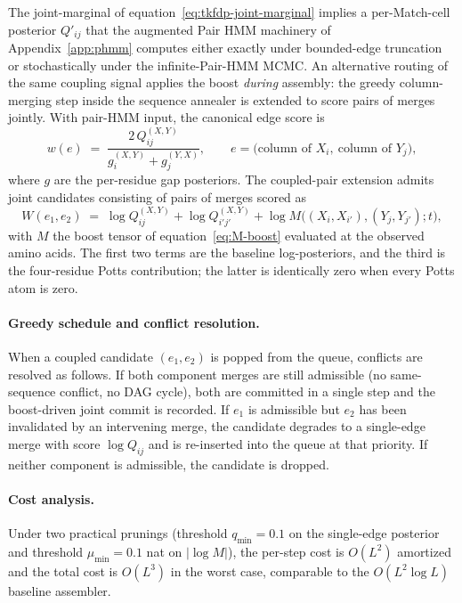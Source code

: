 The joint-marginal of equation~\ref{eq:tkfdp-joint-marginal}
implies a per-Match-cell posterior $Q'_{ij}$ that the augmented
Pair HMM machinery of Appendix~\ref{app:phmm} computes either
exactly under bounded-edge truncation or stochastically under the
infinite-Pair-HMM MCMC. An alternative routing of the same
coupling signal applies the boost \emph{during} assembly: the
greedy column-merging step inside the sequence annealer is extended
to score pairs of merges jointly. With pair-HMM input, the
canonical edge score is
\begin{equation}
\label{eq:tgf-edge}
w(e) \;=\; \frac{2 \, Q_{ij}^{(X, Y)}}{g_i^{(X, Y)} + g_j^{(Y, X)}},
\qquad e = \bigl(\text{column of } X_i,\ \text{column of } Y_j\bigr),
\end{equation}
where $g$ are the per-residue gap posteriors. The coupled-pair
extension admits joint candidates consisting of pairs of merges
scored as
\begin{equation}
\label{eq:coupled-score}
W(e_1, e_2) \;=\; \log Q_{ij}^{(X, Y)} + \log Q_{i'j'}^{(X, Y)}
  + \log M\bigl((X_i, X_{i'}), (Y_j, Y_{j'}); t\bigr),
\end{equation}
with $M$ the boost tensor of equation~\ref{eq:M-boost} evaluated
at the observed amino acids. The first two terms are the baseline
log-posteriors, and the third is the four-residue Potts
contribution; the latter is identically zero when every Potts
atom is zero.

\paragraph{Greedy schedule and conflict resolution.} When a coupled
candidate $(e_1, e_2)$ is popped from the queue, conflicts are
resolved as follows. If both component merges are still admissible
(no same-sequence conflict, no DAG cycle), both are committed in a
single step and the boost-driven joint commit is recorded. If $e_1$
is admissible but $e_2$ has been invalidated by an intervening
merge, the candidate degrades to a single-edge merge with score
$\log Q_{ij}$ and is re-inserted into the queue at that priority.
If neither component is admissible, the candidate is dropped.

\paragraph{Cost analysis.} Under two practical prunings (threshold
$q_{\min} = 0.1$ on the single-edge posterior and threshold
$\mu_{\min} = 0.1$ nat on $|\log M|$), the per-step cost is
$O(L^2)$ amortized and the total cost is $O(L^3)$ in the worst
case, comparable to the $O(L^2 \log L)$ baseline assembler.

